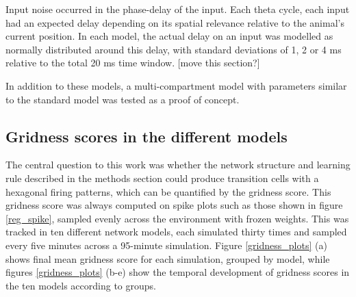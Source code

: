 \documentclass{article}
\begin{document}
    Input noise occurred in the phase-delay of the input. Each theta cycle, each input had an expected delay depending on its spatial relevance relative to the animal's current position. In each model, the actual delay on an input was modelled as normally distributed around this delay, with standard deviations of 1, 2 or 4 ms relative to the total 20 ms time window. [move this section?]

    In addition to these models, a multi-compartment model with parameters similar to the standard model was tested as a proof of concept.

    \subsection{Gridness scores in the different models}
    
    The central question to this work was whether the network structure and learning rule described in the methods section could produce transition cells with a hexagonal firing patterns, which can be quantified by the gridness score. This gridness score was always computed on spike plots such as those shown in figure \ref{reg_spike}, sampled evenly across the environment with frozen weights. This was tracked in ten different network models, each simulated thirty times and sampled every five minutes across a 95-minute simulation. Figure \ref{gridness_plots} (a) shows final mean gridness score for each simulation, grouped by model, while figures \ref{gridness_plots} (b-e) show the temporal development of gridness scores in the ten models according to groups.
    
\end{document}
